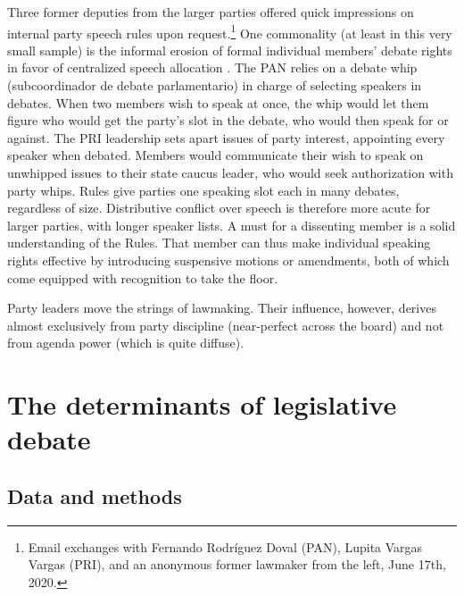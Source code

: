 \documentclass[letter,12pt]{article}
\begin{document}
Three former deputies from the larger parties offered quick impressions on internal party speech rules upon request.\footnote{Email exchanges with Fernando Rodríguez Doval (PAN), Lupita Vargas Vargas (PRI), and an anonymous former lawmaker from the left, June 17th, 2020.} One commonality (at least in this very small sample) is the informal erosion of formal individual members' debate rights in favor of centralized speech allocation \citep[cf.][]{cox.1987}. The PAN relies on a debate whip (subcoordinador de debate parlamentario) in charge of selecting speakers in debates. When two members wish to speak at once, the whip would let them figure who would get the party's slot in the debate, who would then speak for or against. The PRI leadership sets apart issues of party interest, appointing every speaker when debated. Members would communicate their wish to speak on unwhipped issues to their state caucus leader, who would seek authorization with party whips. Rules give parties one speaking slot each in many debates, regardless of size. Distributive conflict over speech is therefore more acute for larger parties, with longer speaker lists. A must for a dissenting member is a solid understanding of the Rules. That member can thus make individual speaking rights effective by introducing suspensive motions or amendments, both of which come equipped with recognition to take the floor. 

Party leaders move the strings of lawmaking. Their influence, however, derives almost exclusively from party discipline (near-perfect across the board) and not from agenda power (which is quite diffuse). 

\section{The determinants of legislative debate} %
 

  \subsection{Data and methods}
\end{document}
